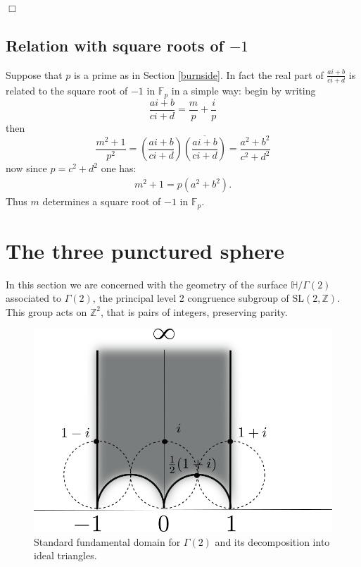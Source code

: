 \documentclass[12pt,a4paper]{amsart}
\def\HH{\mathbb{H}}
\def\xx{\HH/g2}
\def\ZZ{\mathbb{Z}}
\def\fp{\mathbb{F}_p}
\def\sl2{\mathrm{SL}(2, \ZZ)}
\def\g2{\Gamma(2)}
\def\xx{\HH/\g2}
\begin{document}
\hfill $\Box$


\subsection{Relation with square roots of $-1$}

Suppose that $p$ is a prime as in Section \ref{burnside}.
In fact the real part of 
$\frac{ai +b}{ci+d }$ is related to the square
root of $-1$ in $\fp$ in a simple way:
begin by writing
$$
 \frac{ai +b}{ci+d }
= \frac{m}{p} + \frac{i}{p}
$$
then 
$$
\frac{m^2 + 1}{p^2}   
= \left( \frac{ai +b}{ci+d }\right) 
\overline{\left( \frac{ai +b}{ci+d }\right)}
= \frac{a^2 +b^2}{c^2+d^2 }
$$
 now since $p = c^2 + d^2$ one has:
 \begin{eqnarray}
 m^2 + 1
=  p(a^2 + b^2).
\end{eqnarray}
Thus $m$ determines a square root of $-1$ in $\fp$. 

\section{The three punctured sphere}

In this section we are concerned with the geometry of the surface
$\xx$ associated to $\g2$, the principal level 2 congruence subgroup
of $\sl2$. This group acts on $\ZZ^2$, that is pairs of integers,
preserving parity.

 \begin{figure}[hb]
\begin{center}
\includegraphics[scale=.5]{fund_dom.png} 
\end{center}
\caption{Standard fundamental domain for $\g2$ and its decomposition into ideal triangles.}
\label{fund}
\end{figure}
\end{document}

